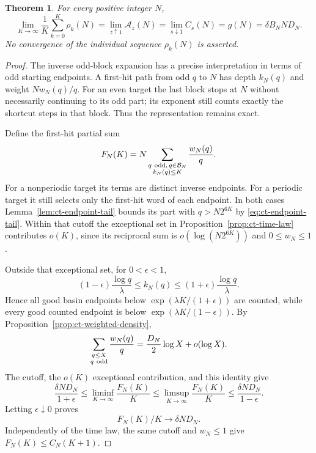 \documentclass[11pt,a4paper]{article}
\newtheorem{theorem}{Theorem}
\begin{document}
\begin{theorem}\label{thm:ct-canonical-identification}
For every positive integer \(N\),
\begin{equation}\label{eq:ct-canonical-identification}
 \lim_{K\to\infty}\frac1K\sum_{k=0}^K\rho_k(N)
 =\lim_{z\uparrow1}\mathcal A_z(N)
 =\lim_{s\downarrow1}C_s(N)
 =g(N)=\delta B_NND_N.
\end{equation}
No convergence of the individual sequence \(\rho_k(N)\) is
asserted.
\end{theorem}
\begin{proof}
The inverse odd-block expansion has a precise interpretation in
terms of odd starting endpoints. A first-hit path from odd \(q\)
to \(N\) has depth \(k_N(q)\) and weight \(Nw_N(q)/q\).
For an even target the last block stops at \(N\) without necessarily
continuing to its odd part; its exponent still counts exactly the
shortcut steps in that block. Thus the representation remains exact.

Define the first-hit partial sum
\[
 F_N(K)=N\sum_{\substack{q\ {\rm odd},\,q\in\mathcal B_N\\
                       k_N(q)\le K}}\frac{w_N(q)}q.
\]
For a nonperiodic target its terms are distinct inverse endpoints.
For a periodic target it still selects only the first-hit word of
each endpoint. In both cases
Lemma~\ref{lem:ct-endpoint-tail} bounds its part with
\(q>N2^{6K}\) by \eqref{eq:ct-endpoint-tail}.
Within that cutoff the exceptional set in
Proposition~\ref{prop:ct-time-law} contributes \(o(K)\), since
its reciprocal sum is \(o(\log(N2^{6K}))\) and \(0\le w_N\le1\).

Outside that exceptional set, for \(0<\epsilon<1\),
\[
 (1-\epsilon)\frac{\log q}{\lambda}
       \le k_N(q)\le
 (1+\epsilon)\frac{\log q}{\lambda}.
\]
Hence all good basin endpoints below
\(\exp(\lambda K/(1+\epsilon))\) are counted, while every good
counted endpoint is below
\(\exp(\lambda K/(1-\epsilon))\).
By Proposition~\ref{prop:ct-weighted-density},
\[
 \sum_{\substack{q\le X\\q\ {\rm odd}}}\frac{w_N(q)}q
       =\frac{D_N}{2}\log X+o(\log X).
\]
The cutoff, the \(o(K)\) exceptional contribution, and this identity
give
\[
 \frac{\delta ND_N}{1+\epsilon}
 \le\liminf_{K\to\infty}\frac{F_N(K)}K
 \le\limsup_{K\to\infty}\frac{F_N(K)}K
 \le\frac{\delta ND_N}{1-\epsilon}.
\]
Letting \(\epsilon\downarrow0\) proves
\begin{equation}\label{eq:ct-first-hit-Cesaro}
 F_N(K)/K\longrightarrow\delta ND_N.
\end{equation}
Independently of the time law, the same cutoff and \(w_N\le1\)
give \(F_N(K)\le C_N(K+1)\).


\end{proof}
\end{document}
